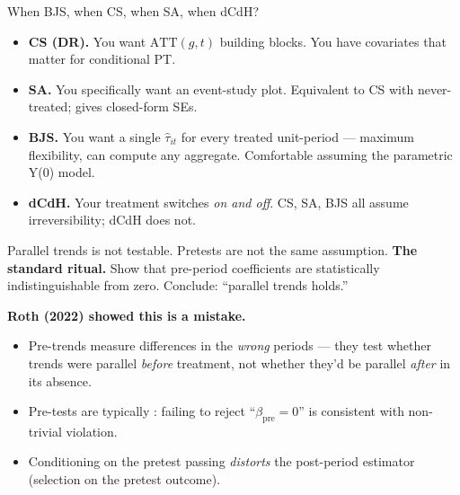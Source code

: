 \documentclass[aspectratio=169,11pt]{beamer}
\begin{document}
\begin{frame}{When BJS, when CS, when SA, when dCdH?}
\vspace{0.4em}
\begin{itemize}\small
  \item \textbf{CS (DR).} \;You want $\text{ATT}(g,t)$ building blocks. \;You have covariates that matter for conditional PT. \;
  \item \textbf{SA.} \;You specifically want an event-study plot. \;Equivalent to CS with never-treated; gives closed-form SEs.
  \item \textbf{BJS.} \;You want a single $\widehat{\tau}_{it}$ for every treated unit-period --- maximum flexibility, can compute any aggregate. \;Comfortable assuming the parametric Y(0) model.
  \item \textbf{dCdH.} \;Your treatment switches \textit{on and off}. \;CS, SA, BJS all assume irreversibility; dCdH does not.
\end{itemize}
\vspace{0.4em}
\end{frame}


\begin{frame}{Parallel trends is not testable. Pretests are not the same assumption.}
\vspace{0.4em}
\textbf{The standard ritual.} \;Show that pre-period coefficients are statistically indistinguishable from zero. \;Conclude: ``parallel trends holds.''
\vspace{0.5em}

\textbf{Roth (2022) showed this is a mistake.}
\begin{itemize}\small
  \item Pre-trends measure differences in the \textit{wrong} periods --- they test whether trends were parallel \textit{before} treatment, not whether they'd be parallel \textit{after} in its absence.
  \item Pre-tests are typically : failing to reject ``$\beta_{\text{pre}} = 0$'' is consistent with non-trivial violation.
  \item Conditioning on the pretest passing \textit{distorts} the post-period estimator (selection on the pretest outcome).
\end{itemize}
\vspace{0.4em}
\end{frame}
\end{document}
